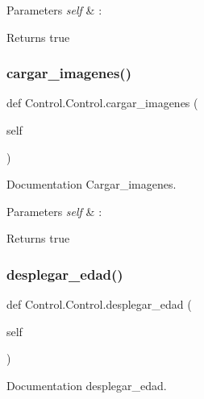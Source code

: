 \begin{DoxyParams}{Parameters}
{\em self} & \+: \\
\hline
\end{DoxyParams}
\begin{DoxyReturn}{Returns}
true 
\end{DoxyReturn}
\mbox{\label{class_control_1_1_control_a75e5202cfb3776a4d9d88ff00db4518a}} 
\subsubsection{\texorpdfstring{cargar\+\_\+imagenes()}{cargar\_imagenes()}}
{\footnotesize\ttfamily def Control.\+Control.\+cargar\+\_\+imagenes (\begin{DoxyParamCaption}\item[{}]{self }\end{DoxyParamCaption})}



Documentation Cargar\+\_\+imagenes. 


\begin{DoxyParams}{Parameters}
{\em self} & \+: \\
\hline
\end{DoxyParams}
\begin{DoxyReturn}{Returns}
true 
\end{DoxyReturn}
\mbox{\label{class_control_1_1_control_a5c05a607e82b93298524f090feaa2397}} 
\subsubsection{\texorpdfstring{desplegar\+\_\+edad()}{desplegar\_edad()}}
{\footnotesize\ttfamily def Control.\+Control.\+desplegar\+\_\+edad (\begin{DoxyParamCaption}\item[{}]{self }\end{DoxyParamCaption})}



Documentation desplegar\+\_\+edad. 


